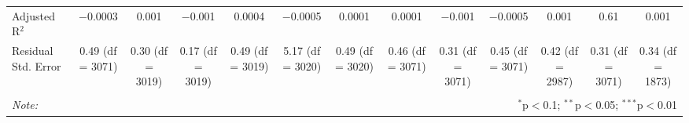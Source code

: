 \begin{table}[!htbp]
{\begin{tabular}{@{\extracolsep{5pt}}lcccccccccccc}
Adjusted R$^{2}$ & $-$0.0003 & 0.001 & $-$0.001 & 0.0004 & $-$0.0005 & 0.0001 & 0.0001 & $-$0.001 & $-$0.0005 & 0.001 & 0.61 & 0.001 \\ 
Residual Std. Error & 0.49 (df = 3071) & 0.30 (df = 3019) & 0.17 (df = 3019) & 0.49 (df = 3019) & 5.17 (df = 3020) & 0.49 (df = 3020) & 0.46 (df = 3071) & 0.31 (df = 3071) & 0.45 (df = 3071) & 0.42 (df = 2987) & 0.31 (df = 3071) & 0.34 (df = 1873) \\ 
\hline 
\hline \\[-1.8ex] 
\textit{Note:}  & \multicolumn{12}{r}{$^{*}$p$<$0.1; $^{**}$p$<$0.05; $^{***}$p$<$0.01} \\ 
\end{tabular} 
}%
\end{table} 
